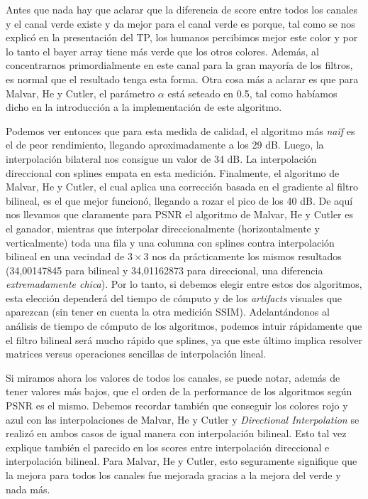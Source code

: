 \begin{itemize}
Antes que nada hay que aclarar que la diferencia de score entre todos los canales y el canal verde existe y da mejor para el canal verde es porque, tal como se nos explicó en la presentación del TP, los humanos percibimos mejor este color y por lo tanto el bayer array tiene más verde que los otros colores. Además, al concentrarnos primordialmente en este canal para la gran mayoría de los filtros, es normal que el resultado tenga esta forma. Otra cosa más a aclarar es que para Malvar, He y Cutler, el parámetro $\alpha$ está seteado en 0.5, tal como habíamos dicho en la introducción a la implementación de este algoritmo.

Podemos ver entonces que para esta medida de calidad, el algoritmo más \textit{naïf} es el de peor rendimiento, llegando aproximadamente a los 29 dB. Luego, la interpolación bilateral nos consigue un valor de 34 dB. La interpolación direccional con splines empata en esta medición. Finalmente, el algoritmo de Malvar, He y Cutler, el cual aplica una corrección basada en el gradiente al filtro bilineal, es el que mejor funcionó, llegando a rozar el pico de los 40 dB. De aquí nos llevamos que claramente para PSNR el algoritmo de Malvar, He y Cutler es el ganador, mientras que interpolar direccionalmente (horizontalmente y verticalmente) toda una fila y una columna con splines contra interpolación bilineal en una vecindad de $3 \times 3$  nos da prácticamente los mismos resultados (34,00147845 para bilineal y 34,01162873 para direccional, una diferencia \textit{extremadamente chica}). Por lo tanto, si debemos elegir entre estos dos algoritmos, esta elección dependerá del tiempo de cómputo y de los \textit{artifacts} visuales que aparezcan (sin tener en cuenta la otra medición SSIM). Adelantándonos al análisis de tiempo de cómputo de los algoritmos, podemos intuir rápidamente que el filtro bilineal será mucho rápido que splines, ya que este último implica resolver matrices versus operaciones sencillas de interpolación lineal.

Si miramos ahora los valores de todos los canales, se puede notar, además de tener valores más bajos, que el orden de la performance de los algoritmos según PSNR es el mismo. Debemos recordar también que conseguir los colores rojo y azul con las interpolaciones de Malvar, He y Cutler y \textit{Directional Interpolation} se realizó en ambos casos de igual manera con interpolación bilineal. Esto tal vez explique también el parecido en los scores entre interpolación direccional e interpolación bilineal. Para Malvar, He y Cutler, esto seguramente signifique que la mejora para todos los canales fue mejorada gracias a la mejora del verde y nada más.


\end{itemize}
